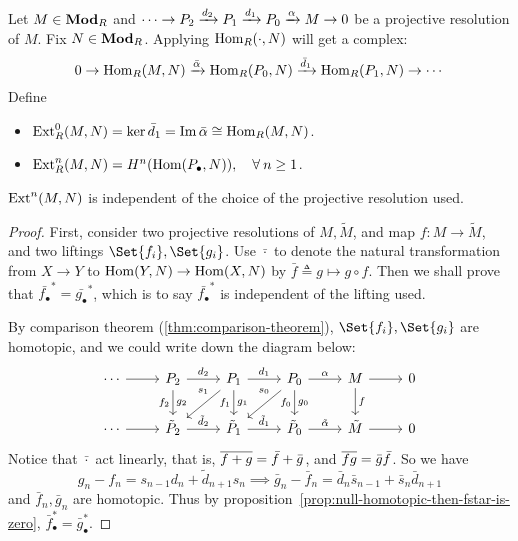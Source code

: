 \begin{definition}
  Let $M \in \mathbf{Mod}_R$ and $\dotsm \to P_2 \xrightarrow{d_2} P_1 \xrightarrow{d_1} P_0 \xrightarrow{\alpha} M \to 0$
  be a projective resolution of $M$. Fix $N \in \mathbf{Mod}_R$. Applying $\operatorname{Hom}_R(\cdot, N)$ will
  get a complex:
  \[
    0 \to \operatorname{Hom}_R(M, N) \xrightarrow{\bar \alpha} \operatorname{Hom}_R(P_0, N) \xrightarrow{\bar d_1}
    \operatorname{Hom}_R(P_1, N) \to \dotsm
  \]
  Define
  \begin{itemize}
    \item $\operatorname{Ext}^0_R(M, N) = \ker \bar d_1 = \operatorname{Im} \bar \alpha \cong \operatorname{Hom}_R(M, N)$.
    \item $\Ext^n_R(M, N) = H^n(\Hom(P_\bullet, N)), \quad \forall n \ge 1$.
  \end{itemize}
\end{definition}

\begin{theorem}
  $\operatorname{Ext}^n(M, N)$ is independent of the choice of the projective resolution used.

  \begin{proof}
    First, consider two projective resolutions of $M, \tilde{M}$, and map $f: M \to \tilde{M}$,
    and two liftings $\Set{f_i}, \Set{g_i}$. Use $\bar{\cdot}$ to
    denote the natural transformation from $X \to Y$ to $\operatorname{Hom}(Y, N) \to \operatorname{Hom}(X, N)$
    by $\bar{f} \triangleq g \mapsto g \circ f$. Then we shall prove that
    $\bar{f_\bullet}^* = \bar{g_\bullet}^*$, which is to say
    $\bar{f_\bullet}^*$ is independent of the lifting used.

    By comparison theorem (\ref{thm:comparison-theorem}), $\Set{f_i}, \Set{g_i}$ are homotopic,
    and we could write down the diagram below:
    \[
      \begin{tikzcd}
        \dotsm \ar[r] & P_2 \ar[r, "d_2"] \ar[d, "g_2", "f_2"']
                      & P_1 \ar[r, "d_1"] \ar[d, "g_1", "f_1"'] \ar[ld, "s_1"' near start]
                      & P_0 \ar[r, "\alpha"] \ar[d, "f_0"', "g_0"] \ar[ld, "s_0"' near start]
                      & M \ar[r] \ar[d, "f"] & 0 \\
        \dotsm \ar[r] & \tilde P_2 \ar[r, "\tilde d_2"]
                      & \tilde P_1 \ar[r, "\tilde d_1"]
                      & \tilde P_0 \ar[r, "\tilde\alpha"]
                      & \tilde M \ar[r] & 0
      \end{tikzcd}
    \]
    Notice that $\bar{\cdot}$ act linearly, that is, $\overline{f + g} = \bar{f} + \bar{g}$,
    and $\overline{fg} = \bar{g} \bar{f}$.
    So we have
    \[ g_n - f_n = s_{n-1} d_n + \tilde d_{n+1} s_n \implies
      \bar g_n - \bar f_n = \bar d_n \bar s_{n-1} + \bar s_n \bar d_{n+1} \]
    and $\bar f_n, \bar g_n$ are homotopic.
    Thus by proposition~\ref{prop:null-homotopic-then-fstar-is-zero},
    $\bar f_\bullet^* = \bar g_\bullet^*$.


\end{proof}
\end{theorem}
